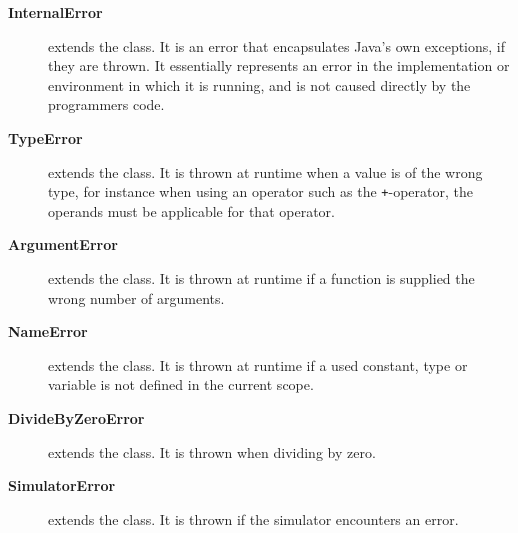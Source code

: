 \begin{description}
\item[\textbf{InternalError}] extends the  class. It is
  an error that encapsulates Java's own exceptions, if they are thrown. It
  essentially represents an error in the implementation or environment in which
  it is running, and is not caused directly by the programmers code.

\item[\textbf{TypeError}] extends the  class. It is
  thrown at runtime when a value is of the wrong type, for instance when using
  an operator such as the \texttt{+}-operator, the operands must be applicable
  for that operator.

\item[\textbf{ArgumentError}] extends the  class. It is
  thrown at runtime if a function is supplied the wrong number of arguments.

\item[\textbf{NameError}] extends the  class. It is
  thrown at runtime if a used constant, type or variable is not defined in the current scope.

\item[\textbf{DivideByZeroError}] extends the  class. It
  is thrown when dividing by zero.

\item[\textbf{SimulatorError}] extends the  class. It is thrown
  if the simulator encounters an error.
\end{description}

